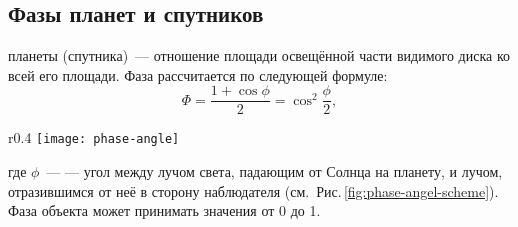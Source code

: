 \subsection{Фазы планет и спутников}

 планеты (спутника)~--- отношение площади освещённой  части видимого диска ко всей его площади.
Фаза рассчитается по следующей формуле:\begin{equation}
\Phi = \frac{1 + \cos \phi}{2} = \cos^2 \frac{\phi}{2},
\end{equation}

\begin{wrapfigure}[8]{r}{0.4\tw}
	\vspace{-.5pc}
	\texttt{[image: phase-angle]}
	\caption{Фазовый угол}
	\label{fig:phase-angel-scheme}
\end{wrapfigure}
где $\phi$~---  --- угол между лучом света, падающим от Солнца на планету, и лучом, отразившимся от неё в сторону наблюдателя (см.~Рис.\,\ref{fig:phase-angel-scheme}). Фаза объекта может принимать значения от 0 до 1.